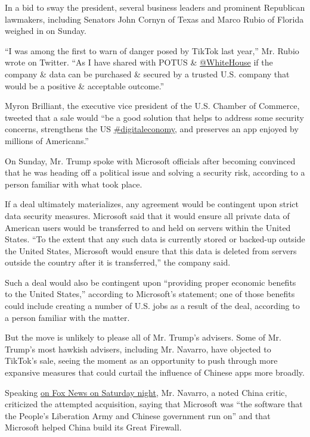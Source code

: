 In a bid to sway the president, several business leaders and prominent
Republican lawmakers, including Senators John Cornyn of Texas and Marco
Rubio of Florida weighed in on Sunday.

``I was among the first to warn of danger posed by TikTok last year,''
Mr. Rubio wrote on Twitter. ``As I have shared with POTUS \&
\href{https://twitter.com/WhiteHouse}{@WhiteHouse} if the company \&
data can be purchased \& secured by a trusted U.S. company that would be
a positive \& acceptable outcome.''

Myron Brilliant, the executive vice president of the U.S. Chamber of
Commerce, tweeted that a sale would ``be a good solution that helps to
address some security concerns, strengthens the US
\href{https://twitter.com/hashtag/digitaleconomy?src=hashtag_click}{\#digitaleconomy},
and preserves an app enjoyed by millions of Americans.''

On Sunday, Mr. Trump spoke with Microsoft officials after becoming
convinced that he was heading off a political issue and solving a
security risk, according to a person familiar with what took place.

If a deal ultimately materializes, any agreement would be contingent
upon strict data security measures. Microsoft said that it would ensure
all private data of American users would be transferred to and held on
servers within the United States. ``To the extent that any such data is
currently stored or backed-up outside the United States, Microsoft would
ensure that this data is deleted from servers outside the country after
it is transferred,'' the company said.

Such a deal would also be contingent upon ``providing proper economic
benefits to the United States,'' according to Microsoft's statement; one
of those benefits could include creating a number of U.S. jobs as a
result of the deal, according to a person familiar with the matter.

But the move is unlikely to please all of Mr. Trump's advisers. Some of
Mr. Trump's most hawkish advisers, including Mr. Navarro, have objected
to TikTok's sale, seeing the moment as an opportunity to push through
more expansive measures that could curtail the influence of Chinese apps
more broadly.

Speaking
\href{https://www.foxnews.com/media/peter-navarro-on-tiktok-china-use-these-social-media-apps-to-track-you-and-surveil-you-and-monitor-your-movements}{on
Fox News on Saturday night}, Mr. Navarro, a noted China critic,
criticized the attempted acquisition, saying that Microsoft was ``the
software that the People's Liberation Army and Chinese government run
on'' and that Microsoft helped China build its Great Firewall.

